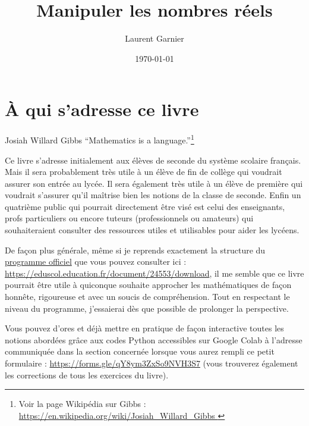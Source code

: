 \documentclass[a4paper,11pt]{book}
\author{Laurent Garnier}
\date{\today}
\title{Manipuler les nombres réels}
\begin{document}
\maketitle
\tableofcontents

\setcounter{tocdepth}{1}
\tableofcontents







\part{À qui s'adresse ce livre}
\label{sec:orge56b974}
\label{org8cd9742}
\label{page:sec1intro}



\begin{myquote}{Josiah Willard Gibbs}
\enquote{Mathematics is a language.}\footnote{Voir la page Wikipédia sur Gibbs : \url{https://en.wikipedia.org/wiki/Josiah_Willard_Gibbs  }}
\end{myquote}
\clearpage

Ce livre s'adresse initialement aux élèves de seconde du système
scolaire français. Mais il sera probablement très utile à un élève
de fin de collège qui voudrait assurer son entrée au lycée. Il sera
également très utile à un élève de première qui voudrait s'assurer
qu'il maîtrise bien les notions de la classe de seconde. Enfin un
quatrième public qui pourrait directement être visé est celui des
enseignants, profs particuliers ou encore tuteurs (professionnels ou
amateurs) qui souhaiteraient consulter des ressources utiles et
utilisables pour aider les lycéens.

De façon plus générale, même si je reprends exactement la structure
du \href{https://eduscol.education.fr/document/24553/download}{programme officiel} que vous pouvez consulter ici :
\url{https://eduscol.education.fr/document/24553/download}, il me semble
que ce livre pourrait être utile à quiconque souhaite approcher les
mathématiques de façon honnête, rigoureuse et avec un soucis de
compréhension. Tout en respectant le niveau du programme, j'essaierai
dès que possible de prolonger la perspective.

Vous pouvez d'ores et déjà mettre en pratique de façon interactive
toutes les notions abordées grâce aux codes Python accessibles sur
Google Colab à l'adresse communiquée dans la section concernée
lorsque vous aurez rempli ce petit formulaire :
\url{https://forms.gle/qY8ym3ZxSo9NVH3S7} (vous trouverez également les
corrections de tous les exercices du livre).
\end{document}
